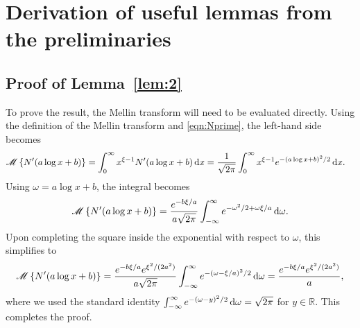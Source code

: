 \chapter{Derivation of useful lemmas from the preliminaries}

\section{Proof of Lemma~\ref{lem:2}}
To prove the result, the Mellin transform will need to be evaluated directly. Using the definition of the Mellin transform and \eqref{eqn:Nprime}, the left-hand side becomes
	\begin{align*}
		\mathscr M \left\{ N'(a\log x + b) \right\} &= \int_0^\infty x^{\xi-1}N'(a\log x + b) \, \mathrm d x = \frac{1}{\sqrt{2\pi}}\int_0^\infty x^{\xi-1}e^{-(a\log x + b)^2/2}\, \mathrm d x.
	\end{align*}
Using $\omega = a\log x + b$, the integral becomes
	\begin{equation*}
		\mathscr M \left\{ N'(a\log x + b) \right\} = \frac{e^{-b\xi/a}}{a\sqrt{2\pi}}\int_{-\infty}^\infty e^{-\omega^2/2 + \omega\xi/a} \, \mathrm d\omega.
	\end{equation*}
Upon completing the square inside the exponential with respect to $\omega$, this simplifies to
	\begin{equation*}
		\mathscr M \left\{ N'(a\log x + b) \right\} =  \frac{e^{-b\xi/a}e^{\xi^2/(2a^2)}}{a\sqrt{2\pi}}\int_{-\infty}^\infty e^{-(\omega - \xi/a)^2/2} \, \mathrm d\omega =  \frac{e^{-b\xi/a}e^{\xi^2/(2a^2)}}{a},
	\end{equation*}
where we used the standard identity $\int_{-\infty}^\infty e^{-(\omega - y)^2/2} \, \mathrm d\omega = \sqrt{2\pi}$ for $y \in \mathbb{R}$. This completes the proof.

